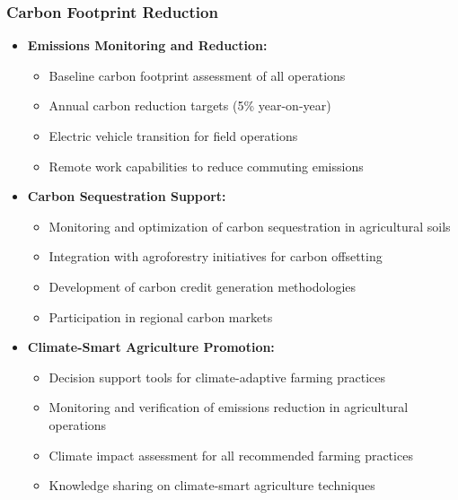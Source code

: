 \subsubsection{Carbon Footprint Reduction}
\begin{itemize}
    \item \textbf{Emissions Monitoring and Reduction:}
    \begin{itemize}
        \item Baseline carbon footprint assessment of all operations
        \item Annual carbon reduction targets (5\% year-on-year)
        \item Electric vehicle transition for field operations
        \item Remote work capabilities to reduce commuting emissions
    \end{itemize}
    
    \item \textbf{Carbon Sequestration Support:}
    \begin{itemize}
        \item Monitoring and optimization of carbon sequestration in agricultural soils
        \item Integration with agroforestry initiatives for carbon offsetting
        \item Development of carbon credit generation methodologies
        \item Participation in regional carbon markets
    \end{itemize}
    
    \item \textbf{Climate-Smart Agriculture Promotion:}
    \begin{itemize}
        \item Decision support tools for climate-adaptive farming practices
        \item Monitoring and verification of emissions reduction in agricultural operations
        \item Climate impact assessment for all recommended farming practices
        \item Knowledge sharing on climate-smart agriculture techniques
    \end{itemize}
\end{itemize}


